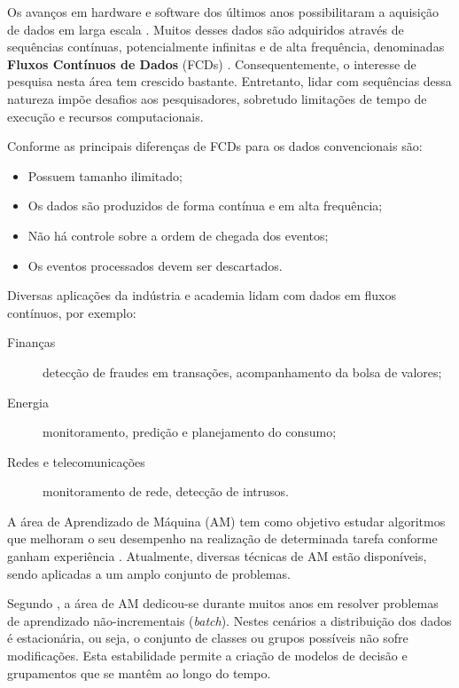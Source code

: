 \documentclass[qual, classic, a4paper]{ufbathesis}
\begin{document}
Os avanços em hardware e software dos últimos anos possibilitaram a aquisição de dados em larga escala \cite{Aggarwal:2003:FCE:1315451.1315460}.
Muitos desses dados são adquiridos através de sequências contínuas, potencialmente infinitas e de alta frequência, 
denominadas \textbf{Fluxos Contínuos de Dados} (FCDs) \cite{Aggarwal:2003:FCE:1315451.1315460, Gama:2010:KDD:1855075, GamaMCR04}.
Consequentemente, o interesse de pesquisa nesta área tem crescido bastante.
Entretanto, lidar com sequências dessa natureza impõe desafios aos pesquisadores, sobretudo limitações de tempo de execução e recursos computacionais.
 
Conforme \cite{Babcock:2002:MID:543613.543615} as principais diferenças de FCDs para os dados convencionais são:
\begin{itemize}
    \item Possuem tamanho ilimitado;
    \item Os dados são produzidos de forma contínua e em alta frequência;
    \item Não há controle sobre a ordem de chegada dos eventos;
    \item Os eventos processados devem ser descartados.
\end{itemize}

Diversas aplicações da indústria e academia lidam com dados em fluxos contínuos, por exemplo:

\begin{description}
    \item[Finanças] detecção de fraudes em transações, acompanhamento da bolsa de valores;
    \item[Energia] monitoramento, predição e planejamento do consumo;
    \item[Redes e telecomunicações] monitoramento de rede, detecção de intrusos.
\end{description}

A área de Aprendizado de Máquina (AM) tem como objetivo estudar algoritmos que melhoram o seu desempenho na realização de determinada tarefa conforme ganham experiência \cite{Mitchell:1997:ML:541177}.
Atualmente, diversas técnicas de AM estão disponíveis, sendo aplicadas a um amplo conjunto de problemas.

Segundo \cite{Gama:2010:KDD:1855075}, a área de AM dedicou-se durante muitos anos em resolver problemas de aprendizado não-incrementais (\textit{batch}).
Nestes cenários a distribuição dos dados é estacionária, ou seja, o conjunto de classes ou grupos possíveis não sofre modificações.
Esta estabilidade permite a criação de modelos de decisão e grupamentos que se mantêm ao longo do tempo.
\end{document}
